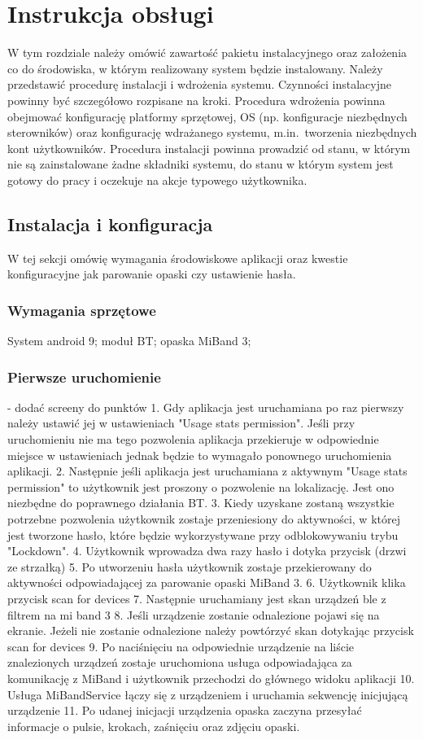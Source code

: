 \chapter{Instrukcja obsługi}
\thispagestyle{chapterBeginStyle}

W tym rozdziale należy omówić zawartość pakietu instalacyjnego oraz założenia co do środowiska, w którym realizowany system będzie instalowany. Należy przedstawić procedurę instalacji i wdrożenia systemu. Czynności instalacyjne powinny być szczegółowo rozpisane na kroki. Procedura wdrożenia powinna obejmować konfigurację platformy sprzętowej, OS (np. konfiguracje niezbędnych sterowników) oraz konfigurację wdrażanego systemu, m.in.\ tworzenia niezbędnych kont użytkowników. Procedura instalacji powinna prowadzić od stanu, w którym nie są zainstalowane żadne składniki systemu, do stanu w którym system jest gotowy do pracy i oczekuje na akcje typowego użytkownika.

\section{Instalacja i konfiguracja}
W tej sekcji omówię wymagania środowiskowe aplikacji oraz kwestie konfiguracyjne jak parowanie opaski czy ustawienie hasła.
\subsection{Wymagania sprzętowe}
System android 9; moduł BT; opaska MiBand 3; 
\subsection{Pierwsze uruchomienie}
- dodać screeny do punktów
1. Gdy aplikacja jest uruchamiana po raz pierwszy należy ustawić jej w ustawieniach "Usage stats permission". Jeśli przy uruchomieniu nie ma tego pozwolenia aplikacja przekieruje w odpowiednie miejsce w ustawieniach jednak będzie to wymagało ponownego uruchomienia aplikacji.
2. Następnie jeśli aplikacja jest uruchamiana z aktywnym "Usage stats permission" to użytkownik jest proszony o pozwolenie na lokalizację. Jest ono niezbędne do poprawnego działania BT.
3. Kiedy uzyskane zostaną wszystkie potrzebne pozwolenia użytkownik zostaje przeniesiony do aktywności, w której jest tworzone hasło, które będzie wykorzystywane przy odblokowywaniu trybu "Lockdown".
4. Użytkownik wprowadza dwa razy hasło i dotyka przycisk (drzwi ze strzałką)
5. Po utworzeniu hasła użytkownik zostaje przekierowany do aktywności odpowiadającej za parowanie opaski MiBand 3. 
6. Użytkownik klika przycisk scan for devices
7. Następnie uruchamiany jest skan urządzeń ble z filtrem na mi band 3
8. Jeśli urządzenie zostanie odnalezione pojawi się na ekranie. Jeżeli nie zostanie odnalezione należy powtórzyć skan dotykając przycisk scan for devices
9. Po naciśnięciu na odpowiednie urządzenie na liście znalezionych urządzeń zostaje uruchomiona usługa odpowiadająca za komunikację z MiBand i użytkownik przechodzi do głównego widoku aplikacji
10. Usługa MiBandService łączy się z urządzeniem i uruchamia sekwencję inicjującą urządzenie
11. Po udanej inicjacji urządzenia opaska zaczyna przesyłać informacje o pulsie, krokach, zaśnięciu oraz zdjęciu opaski.


